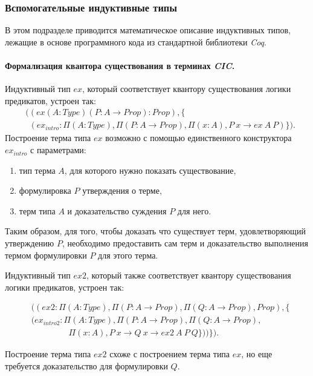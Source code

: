 \documentclass[12pt]{article}
\begin{document}
\subsubsection{Вспомогательные индуктивные типы}
В этом подразделе приводится математическое описание индуктивных типов, лежащие в основе программного кода из стандартной библиотеки \textit{Coq}\cite{lib}.

\paragraph{Формализация квантора существования в терминах \textit{CIC}.}\mbox{}

Индуктивный тип $ex$, который соответствует квантору существования логики предикатов, устроен так:
\begin{align*}
& ((ex(A:Type)(P:A\xrightarrow{}Prop):Prop), \{ \\ 
& \ \ (ex_{intro} : \Pi (A:Type),\Pi (P:A\xrightarrow{}Prop), \Pi(x:A), P\ x \xrightarrow{} ex\ A\ P) \}).
\end{align*}
Построение терма типа $ex$ возможно с помощью единственного конструктора $ex_{intro}$ с параметрами: 
\begin{enumerate}
    \item тип терма $A$, для которого нужно показать существование,
    \item формулировка $P$ утверждения о терме,
    \item терм типа $A$ и доказательство суждения $P$ для него.
\end{enumerate}

Таким образом, для того, чтобы доказать что существует терм, удовлетворяющий утверждению $P$, необходимо предоставить сам терм и доказательство выполнения термом формулировки $P$ для этого терма.

Индуктивный тип $ex2$, который также соответствует квантору существования логики предикатов, устроен так:

\begin{align*}
& ((ex2:\Pi(A:Type),\Pi(P:A\xrightarrow{}Prop),\Pi(Q:A\xrightarrow{}Prop),Prop), \{ \\ 
& (ex_{intro2} : \Pi (A:Type),\Pi (P:A\xrightarrow{}Prop),\Pi(Q:A\xrightarrow{}Prop),\\ & 
\ \ \ \ \ \ \ \ \ \ \ \ \ \ \ \ \ \ \ \ \Pi(x:A), P\ x \xrightarrow{} Q\ x \xrightarrow{} ex2\ A\ P\ Q\})) \}).
\end{align*}

Построение терма типа $ex2$ схоже с построением терма типа $ex$, но еще требуется доказательство для формулировки $Q$.
\end{document}
